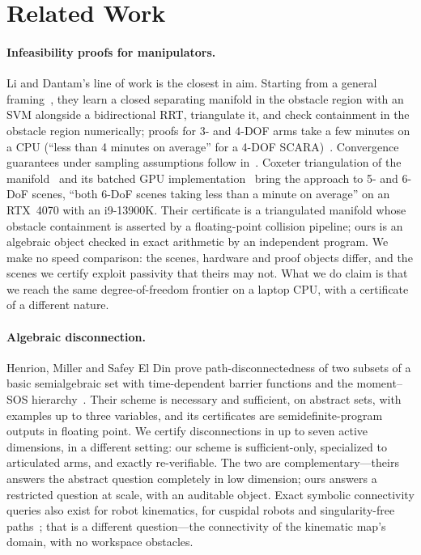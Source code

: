 \documentclass[10pt,twocolumn,letterpaper]{article}
\begin{document}
\section{Related Work}

\paragraph{Infeasibility proofs for manipulators.} Li and Dantam's line of work is the closest in aim. Starting from a general framing~\cite{li2020iros}, they learn a closed separating manifold in the obstacle region with an SVM alongside a bidirectional RRT, triangulate it, and check containment in the obstacle region numerically; proofs for 3- and 4-DOF arms take a few minutes on a CPU (``less than 4 minutes on average'' for a 4-DOF SCARA)~\cite{li2021rss,li2023ijrr}. Convergence guarantees under sampling assumptions follow in~\cite{li2022wafr}. Coxeter triangulation of the manifold~\cite{li2023ral} and its batched GPU implementation~\cite{li2024gpu} bring the approach to 5- and 6-DoF scenes, ``both 6-DoF scenes taking less than a minute on average'' on an RTX~4070 with an i9-13900K. Their certificate is a triangulated manifold whose obstacle containment is asserted by a floating-point collision pipeline; ours is an algebraic object checked in exact arithmetic by an independent program. We make no speed comparison: the scenes, hardware and proof objects differ, and the scenes we certify exploit passivity that theirs may not. What we do claim is that we reach the same degree-of-freedom frontier on a laptop CPU, with a certificate of a different nature.

\paragraph{Algebraic disconnection.} Henrion, Miller and Safey El Din prove path-disconnectedness of two subsets of a basic semialgebraic set with time-dependent barrier functions and the moment--SOS hierarchy~\cite{henrion2024}. Their scheme is necessary and sufficient, on abstract sets, with examples up to three variables, and its certificates are semidefinite-program outputs in floating point. We certify disconnections in up to seven active dimensions, in a different setting: our scheme is sufficient-only, specialized to articulated arms, and exactly re-verifiable. The two are complementary---theirs answers the abstract question completely in low dimension; ours answers a restricted question at scale, with an auditable object. Exact symbolic connectivity queries also exist for robot kinematics, for cuspidal robots and singularity-free paths~\cite{capco2020,capco2023}; that is a different question---the connectivity of the kinematic map's domain, with no workspace obstacles.
\end{document}
